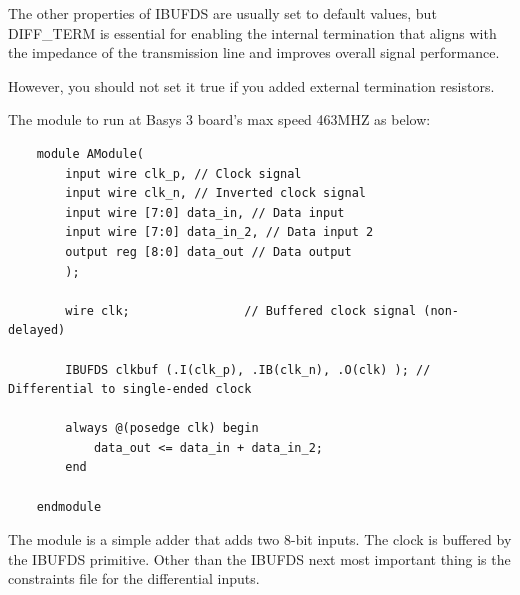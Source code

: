 \documentclass{report}
\begin{document}
The other properties of IBUFDS are usually set to default values, but DIFF\_TERM is essential for enabling the internal termination that aligns with the impedance of the transmission line and improves overall signal performance.

However, you should not set it true if you added external termination resistors. 

The module to run at Basys 3 board's max speed 463MHZ as below:
\begin{verbatim}
    module AModule(
        input wire clk_p, // Clock signal
        input wire clk_n, // Inverted clock signal
        input wire [7:0] data_in, // Data input
        input wire [7:0] data_in_2, // Data input 2
        output reg [8:0] data_out // Data output
        );
    
        wire clk;                // Buffered clock signal (non-delayed)
    
        IBUFDS clkbuf (.I(clk_p), .IB(clk_n), .O(clk) ); // Differential to single-ended clock
    
        always @(posedge clk) begin
            data_out <= data_in + data_in_2;
        end
    
    endmodule
\end{verbatim}
The module is a simple adder that adds two 8-bit inputs. The clock is buffered by the IBUFDS primitive. Other than the IBUFDS next most important thing is the constraints file for the differential inputs. 
\end{document}

